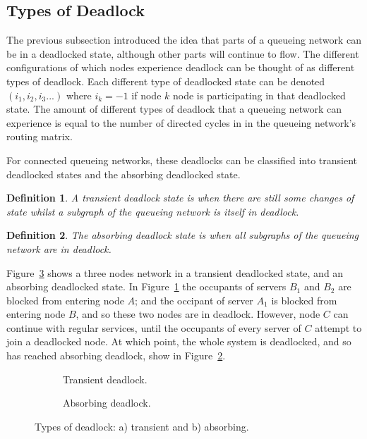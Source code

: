 \documentclass{article}
\newtheorem{definition}{Definition}
\begin{document}
\subsection{Types of Deadlock}
The previous subsection introduced the idea that parts of a queueing network can be in a deadlocked state, although other parts will continue to flow.
The different configurations of which nodes experience deadlock can be thought
of as different types of deadlock.
Each different type of deadlocked state can be denoted $(i_1, i_2, i_3...)$ where $i_k = -1$ if node $k$ node is participating in that deadlocked state.
The amount of different types of deadlock that a queueing network can experience
is equal to the number of directed cycles in in the queueing network's routing
matrix. %

For connected queueing networks, these deadlocks can be classified into transient deadlocked states and the absorbing deadlocked state.\\


\begin{definition}
    A transient deadlock state is when there are still some changes of state
    whilst a subgraph of the queueing network is itself in deadlock.\\
\end{definition}

\begin{definition}
    The absorbing deadlock state is when all subgraphs of the
    queueing network are in deadlock.\\
\end{definition}

Figure~\ref{fig:transabsorb} shows a three nodes network in a transient deadlocked state, and an absorbing deadlocked state.
In Figure~\ref{fig:trans} the occupants of servers $B_1$ and $B_2$ are blocked from entering node $A$; and the occipant of server $A_1$ is blocked from entering node $B$, and so these two nodes are in deadlock.
However, node $C$ can continue with regular services, until the occupants of every server of $C$ attempt to join a deadlocked node.
At which point, the whole system is deadlocked, and so has reached absorbing deadlock, show in Figure~\ref{fig:absorb}.

\begin{figure}[H]
\begin{subfigure}[b]{0.5\textwidth}
  
  \caption{Transient deadlock.}
  \label{fig:trans}
\end{subfigure}
\begin{subfigure}[b]{0.5\textwidth}
  
  \caption{Absorbing deadlock.}
  \label{fig:absorb}
\end{subfigure}
\caption{Types of deadlock: a) transient and b) absorbing.}
\label{fig:transabsorb}
\end{figure}
\end{document}
